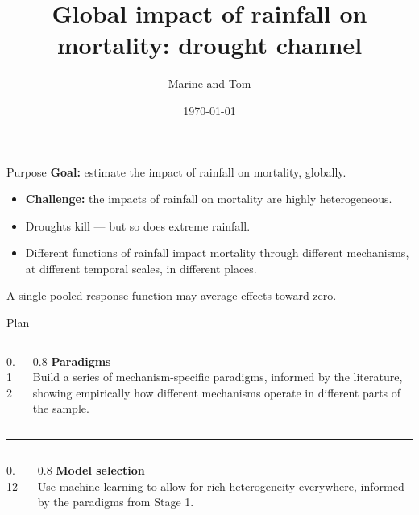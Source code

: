 \documentclass[10pt, aspectratio=169]{beamer}
\title{Global impact of rainfall on mortality: drought channel}
\author{Marine and Tom}
\date{\today}
\begin{document}
\begin{frame}[plain]\titlepage\end{frame}


\begin{frame}{Purpose}
  \textbf{Goal:} estimate the impact of rainfall on mortality, globally.
  \vspace{1em}
  \begin{itemize}
    \item \textbf{Challenge:} the impacts of rainfall on mortality are highly heterogeneous.
    \item Droughts kill --- but so does extreme rainfall. 
    \item Different functions of rainfall impact mortality through different mechanisms, at different temporal scales, in different places.
  \end{itemize}
  \vspace{1em}
  A single pooled response function may average effects toward zero.
\end{frame}

\begin{frame}{Plan}
  \vfill
  \begin{columns}[c]
    \begin{column}{0.12\textwidth}
    \end{column}
    \begin{column}{0.8\textwidth}
      {\large\textbf{Paradigms}}\\[0.4em]
      Build a series of mechanism-specific paradigms, informed by the literature, showing empirically how different mechanisms operate in different parts of the sample.
    \end{column}
  \end{columns}
  \vspace{1.2em}
  {\color{black!20}\hrule}
  \vspace{1.2em}
  \begin{columns}[c]
    \begin{column}{0.12\textwidth}
    \end{column}
    \begin{column}{0.8\textwidth}
      {\large\textbf{Model selection}}\\[0.4em]
      Use machine learning to allow for rich heterogeneity everywhere, informed by the paradigms from Stage 1.
    \end{column}
  \end{columns}
  \vfill
\end{frame}
\end{document}

